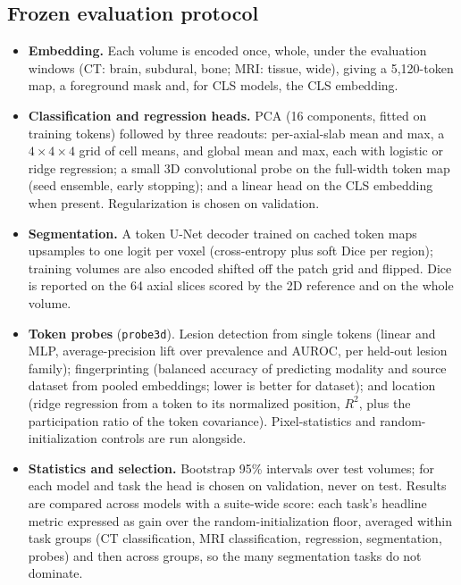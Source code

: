 \documentclass[10pt]{article}
\newcommand{\code}[1]{\texttt{#1}}
\begin{document}
\subsection{Frozen evaluation protocol}

\begin{itemize}
  \item \textbf{Embedding.} Each volume is encoded once, whole, under the evaluation windows (CT: brain, subdural,
  bone; MRI: tissue, wide), giving a 5{,}120-token map, a foreground mask and, for CLS models, the CLS embedding.
  \item \textbf{Classification and regression heads.} PCA (16 components, fitted on training tokens) followed by
  three readouts: per-axial-slab mean and max, a $4\times4\times4$ grid of cell means, and global mean and max, each
  with logistic or ridge regression; a small 3D convolutional probe on the full-width token map (seed ensemble,
  early stopping); and a linear head on the CLS embedding when present. Regularization is chosen on validation.
  \item \textbf{Segmentation.} A token U-Net decoder trained on cached token maps upsamples to one logit per voxel
  (cross-entropy plus soft Dice per region); training volumes are also encoded shifted off the patch grid and flipped.
  Dice is reported on the 64 axial slices scored by the 2D reference and on the whole volume.
  \item \textbf{Token probes} (\code{probe3d}). Lesion detection from single tokens (linear and MLP, average-precision
  lift over prevalence and AUROC, per held-out lesion family); fingerprinting (balanced accuracy of predicting
  modality and source dataset from pooled embeddings; lower is better for dataset); and location (ridge regression from
  a token to its normalized position, $R^2$, plus the participation ratio of the token covariance). Pixel-statistics
  and random-initialization controls are run alongside.
  \item \textbf{Statistics and selection.} Bootstrap 95\% intervals over test volumes; for each model and task the
  head is chosen on validation, never on test. Results are compared across models with a suite-wide score: each
  task's headline metric expressed as gain over the random-initialization floor, averaged within task groups (CT
  classification, MRI classification, regression, segmentation, probes) and then across groups, so the many
  segmentation tasks do not dominate.
\end{itemize}
\end{document}
